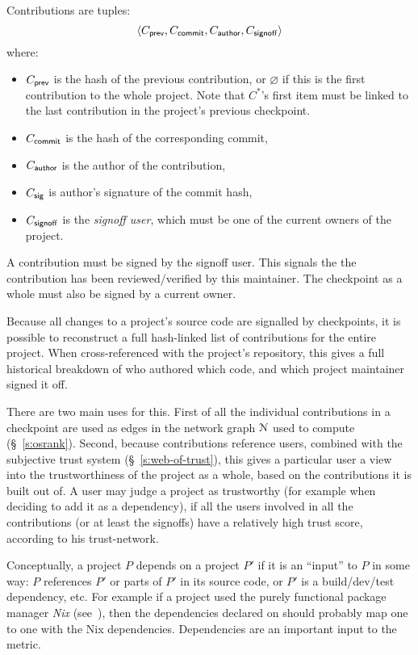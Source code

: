 Contributions are tuples:
\[
   \langle C_{\mathsf{prev}}, C_{\mathsf{commit}}, C_{\mathsf{author}}, C_{\mathsf{signoff}}\rangle
\]
where:
\begin{itemize}
\item $C_{\mathsf{prev}}$ is the hash of the previous contribution, or
  $\varnothing$ if this is the first contribution to the whole
  project. Note that $C^*$'s first item must be linked to the last
  contribution in the project's previous checkpoint.
\item $C_{\mathsf{commit}}$ is the hash of the corresponding commit,
\item $C_{\mathsf{author}}$ is the author of the contribution,
\item $C_{\mathsf{sig}}$ is author's signature of the commit hash,
\item $C_{\mathsf{signoff}}$ is the \emph{signoff user}, which must be
  one of the current owners of the project.
\end{itemize}
A contribution must be signed by the signoff user. This signals the
the contribution has been reviewed/verified by this maintainer. The
checkpoint as a whole must also be signed by a current owner.

Because all changes to a project's source code are signalled by
checkpoints, it is possible to reconstruct a full hash-linked list of
contributions for the entire project. When cross-referenced with the
project's repository, this gives a full historical breakdown of who
authored which code, and which project maintainer signed it off.

There are two main uses for this. First of all the individual
contributions in a checkpoint are used as edges in the network graph
$\mathcal{N}$ used to compute \osrank{} (\S~\ref{s:osrank}).
Second, because contributions reference users, combined with the
subjective trust system (\S~\ref{s:web-of-trust}), this gives a
particular user a view into the trustworthiness of the project as a
whole, based on the contributions it is built out of. A user may judge
a project as trustworthy (for example when deciding to add it as a
dependency), if all the users involved in all the contributions (or at
least the signoffs) have a relatively high trust score, according to
his trust-network.

\label{s:dependencies}
Conceptually, a project $P$ depends on a project $P'$ if it is an
``input'' to $P$ in some way: $P$ references $P'$ or parts of
$P'$ in its source code, or $P'$ is a build/dev/test dependency,
etc. For example if a project used the purely functional package
manager \emph{Nix} (see~\cite{nix}), then the dependencies declared on
\oscoin{} should probably map one to one with the Nix
dependencies. Dependencies are an important input to the \osrank{}
metric.

